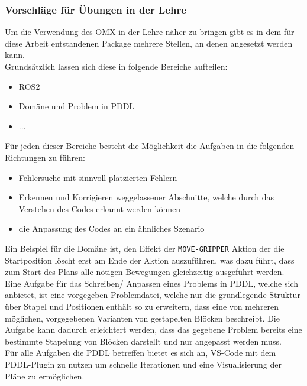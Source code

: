 \subsubsection{Vorschläge für Übungen in der Lehre}
Um die Verwendung des OMX in der Lehre näher zu bringen gibt es in dem für diese Arbeit entstandenen Package mehrere Stellen, an denen angesetzt werden kann.\\
Grundsätzlich lassen sich diese in folgende Bereiche aufteilen:
\begin{itemize}
\item \ac{ROS2}
\item Domäne und Problem in PDDL
\item ...
\end{itemize}
Für jeden dieser Bereiche besteht die Möglichkeit die Aufgaben in die folgenden Richtungen zu führen:
\begin{itemize}
\item Fehlersuche mit sinnvoll platzierten Fehlern
\item Erkennen und Korrigieren weggelassener Abschnitte, welche durch das Verstehen des Codes erkannt werden können
\item die Anpassung des Codes an ein ähnliches Szenario
\end{itemize}
Ein Beispiel für die Domäne ist, den Effekt der \verb|MOVE-GRIPPER| Aktion der die Startposition löscht erst am Ende der Aktion auszuführen, was dazu führt, dass zum Start des Plans alle nötigen Bewegungen gleichzeitig ausgeführt werden.\\
Eine Aufgabe für das Schreiben/ Anpassen eines Problems in PDDL, welche sich anbietet, ist eine vorgegeben Problemdatei, welche nur die grundlegende Struktur über Stapel und Positionen enthält so zu erweitern, dass eine von mehreren möglichen, vorgegebenen Varianten von gestapelten Blöcken beschreibt.
Die Aufgabe kann dadurch erleichtert werden, dass das gegebene Problem bereits eine bestimmte Stapelung von Blöcken darstellt und nur angepasst werden muss.\\
Für alle Aufgaben die PDDL betreffen bietet es sich an, VS-Code mit dem PDDL-Plugin zu nutzen um schnelle Iterationen und eine Visualisierung der Pläne zu ermöglichen.